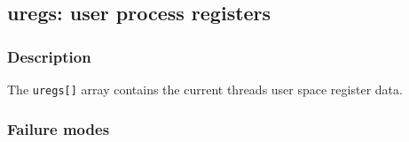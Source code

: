 \clearpage
{}
{}
\label{vars:uregs}
\subsection*{uregs: user process registers}

\subsubsection*{Description}

The \verb|uregs[]| array contains the current threads user space
register data.

\subsubsection*{Failure modes}


